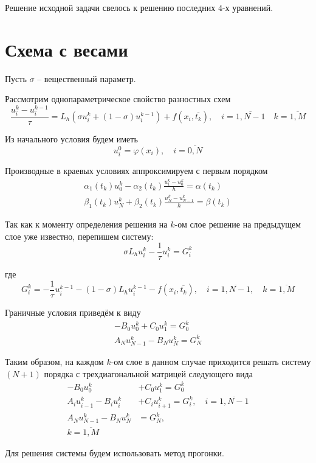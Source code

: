 \documentclass[a4paper,12pt]{article}
\begin{document}
    Решение исходной задачи свелось к решению последних 4-х уравнений.

\section{Схема с весами}

    Пусть $\sigma$ -- вещественный параметр.

    Рассмотрим однопараметрическое свойство разностных схем
    $$\frac{u_{i}^{k}-u_{i}^{k-1}}{\tau}=L_{h}\left(\sigma u_{i}^{k}+(1-\sigma) u_{i}^{k-1}\right)+f\left(x_{i}, \overline{t_{k}}\right), \quad i=\overline{1, N-1} \quad k=\overline{1, M}$$

    Из начального условия будем иметь
    $$u_{i}^{0}=\varphi\left(x_{i}\right), \quad i=\overline{0, N}$$

    Производные в краевых условиях аппроксимируем с первым порядком
    $$\begin{array}{c}
        \alpha_{1}\left(t_{k}\right) u_{0}^{k}-\alpha_{2}\left(t_{k}\right) \frac{u_{1}^{k}-u_{0}^{k}}{h}=\alpha\left(t_{k}\right) \\
        \beta_{1}\left(t_{k}\right) u_{N}^{k}+\beta_{2}\left(t_{k}\right) \frac{u_{N}^{k}-u_{N-1}^{k}}{h}=\beta\left(t_{k}\right)
    \end{array}$$

    Так как к моменту определения решения на $k$-ом слое решение на предыдущем слое уже известно, перепишем систему:
    $$\sigma L_{h} u_{i}^{k}-\frac{1}{\tau} u_{i}^{k}=G_{i}^{k}$$

    где
    $$G_{i}^{k}=-\frac{1}{\tau} u_{i}^{k-1}-(1-\sigma) L_{h} u_{i}^{k-1}-f\left(x_{i}, \overline{t_{k}}\right), \quad i=\overline{1, N-1}, \quad k=\overline{1, M}$$

    Граничные условия приведём к виду
    $$\begin{array}{l}
        -B_{0} u_{0}^{k}+C_{0} u_{1}^{k}=G_{0}^{k} \\
        A_{N} u_{N-1}^{k}-B_{N} u_{N}^{k}=G_{N}^{k}
    \end{array}$$

    Таким образом, на каждом $k$-ом слое в данном случае приходится решать систему $(N+1)$ порядка с трехдиагональной матрицей следующего вида
    $$\begin{aligned}
        -B_{0} u_{0}^{k} &+C_{0} u_{1}^{k}=G_{0}^{k} \\
        A_{i} u_{i-1}^{k}-B_{i} u_{i}^{k} &+C_{i} u_{i+1}^{k}=G_{i}^{k}, \quad i=\overline{1, N-1} \\ A_{N} u_{N-1}^{k}-B_{N} u_{N}^{k} &=G_{N}^{k}, \\
        k=\overline{1, M}
    \end{aligned}$$

    Для решения системы будем использовать метод прогонки.
\end{document}
